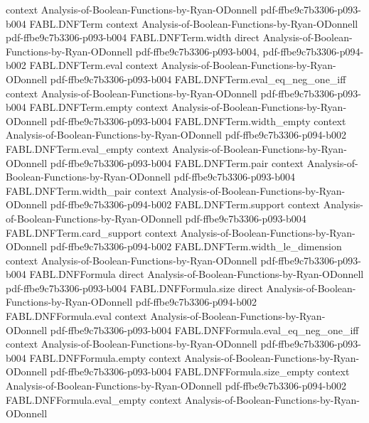 \begin{theorem}
  {context}
  {Analysis-of-Boolean-Functions-by-Ryan-ODonnell}
  {pdf-ffbe9c7b3306-p093-b004}
\proofstep
  {FABL.DNFTerm}
  {context}
  {Analysis-of-Boolean-Functions-by-Ryan-ODonnell}
  {pdf-ffbe9c7b3306-p093-b004}
\proofstep
  {FABL.DNFTerm.width}
  {direct}
  {Analysis-of-Boolean-Functions-by-Ryan-ODonnell}
  {pdf-ffbe9c7b3306-p093-b004,
    pdf-ffbe9c7b3306-p094-b002}
\proofstep
  {FABL.DNFTerm.eval}
  {context}
  {Analysis-of-Boolean-Functions-by-Ryan-ODonnell}
  {pdf-ffbe9c7b3306-p093-b004}
\proofstep
  {FABL.DNFTerm.eval_eq_neg_one_iff}
  {context}
  {Analysis-of-Boolean-Functions-by-Ryan-ODonnell}
  {pdf-ffbe9c7b3306-p093-b004}
\proofstep
  {FABL.DNFTerm.empty}
  {context}
  {Analysis-of-Boolean-Functions-by-Ryan-ODonnell}
  {pdf-ffbe9c7b3306-p093-b004}
\proofstep
  {FABL.DNFTerm.width_empty}
  {context}
  {Analysis-of-Boolean-Functions-by-Ryan-ODonnell}
  {pdf-ffbe9c7b3306-p094-b002}
\proofstep
  {FABL.DNFTerm.eval_empty}
  {context}
  {Analysis-of-Boolean-Functions-by-Ryan-ODonnell}
  {pdf-ffbe9c7b3306-p093-b004}
\proofstep
  {FABL.DNFTerm.pair}
  {context}
  {Analysis-of-Boolean-Functions-by-Ryan-ODonnell}
  {pdf-ffbe9c7b3306-p093-b004}
\proofstep
  {FABL.DNFTerm.width_pair}
  {context}
  {Analysis-of-Boolean-Functions-by-Ryan-ODonnell}
  {pdf-ffbe9c7b3306-p094-b002}
\proofstep
  {FABL.DNFTerm.support}
  {context}
  {Analysis-of-Boolean-Functions-by-Ryan-ODonnell}
  {pdf-ffbe9c7b3306-p093-b004}
\proofstep
  {FABL.DNFTerm.card_support}
  {context}
  {Analysis-of-Boolean-Functions-by-Ryan-ODonnell}
  {pdf-ffbe9c7b3306-p094-b002}
\proofstep
  {FABL.DNFTerm.width_le_dimension}
  {context}
  {Analysis-of-Boolean-Functions-by-Ryan-ODonnell}
  {pdf-ffbe9c7b3306-p093-b004}
\proofstep
  {FABL.DNFFormula}
  {direct}
  {Analysis-of-Boolean-Functions-by-Ryan-ODonnell}
  {pdf-ffbe9c7b3306-p093-b004}
\proofstep
  {FABL.DNFFormula.size}
  {direct}
  {Analysis-of-Boolean-Functions-by-Ryan-ODonnell}
  {pdf-ffbe9c7b3306-p094-b002}
\proofstep
  {FABL.DNFFormula.eval}
  {context}
  {Analysis-of-Boolean-Functions-by-Ryan-ODonnell}
  {pdf-ffbe9c7b3306-p093-b004}
\proofstep
  {FABL.DNFFormula.eval_eq_neg_one_iff}
  {context}
  {Analysis-of-Boolean-Functions-by-Ryan-ODonnell}
  {pdf-ffbe9c7b3306-p093-b004}
\proofstep
  {FABL.DNFFormula.empty}
  {context}
  {Analysis-of-Boolean-Functions-by-Ryan-ODonnell}
  {pdf-ffbe9c7b3306-p093-b004}
\proofstep
  {FABL.DNFFormula.size_empty}
  {context}
  {Analysis-of-Boolean-Functions-by-Ryan-ODonnell}
  {pdf-ffbe9c7b3306-p094-b002}
\proofstep
  {FABL.DNFFormula.eval_empty}
  {context}
  {Analysis-of-Boolean-Functions-by-Ryan-ODonnell}

\end{theorem}
